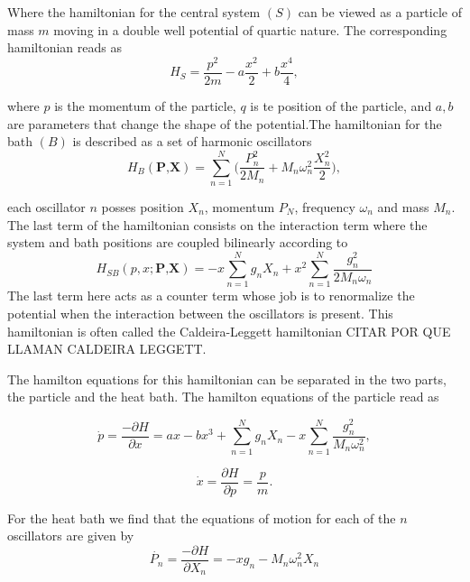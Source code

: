 Where the hamiltonian for the central system $(S)$ can be viewed as a particle of mass $m$ moving in a double well potential of quartic nature. The corresponding hamiltonian reads as
\begin{equation}
H_{S}=\frac{p^2}{2m}-a\frac{x^2}{2}+b\frac{x^4}{4},
\end{equation}

where $p$ is the momentum of the particle, $q$ is te position of the particle, and $a,b$ are parameters that change the shape of the potential.The hamiltonian for the bath $(B)$ is described as a set of harmonic oscillators
\begin{equation}
H_B(\textbf{P,X})= \sum_{n=1}^N \Big(\frac{P_n^2}{2M_n}+M_n \omega_n^2\frac{X_n^2}{2} \Big),
\end{equation}

each oscillator $n$ posses position $X_n$, momentum $P_N$, frequency $\omega_n$ and mass $M_n$. The last term of the hamiltonian consists on the interaction term where the system and bath positions are coupled bilinearly according to
\begin{equation}
H_{SB}(p,x;\textbf{P,X})=-x\sum_{n=1}^N g_n X_n+x^2 \sum_{n=1}^N\frac{g_n^2}{2M_n \omega_n}
\end{equation}
The last term here acts as a counter term whose job is to renormalize the potential when the interaction between the oscillators is present. This hamiltonian is often called the Caldeira-Leggett hamiltonian CITAR POR QUE LLAMAN CALDEIRA LEGGETT.\par 

The hamilton equations for this hamiltonian can be separated in the two parts, the particle and the heat bath. The hamilton equations of the particle read as

\begin{equation}
\dot{p}=\frac{-\partial H}{\partial x}=ax-bx^3+\sum_{n=1}^N g_n X_n-x\sum_{n=1}^N \frac{g_n^2}{M_n \omega_n^2},
\end{equation}

\begin{equation}
\dot{x}=\frac{\partial H}{\partial p}=\frac{p}{m}.
\end{equation}

For the heat bath we find that the equations of motion for each of the $n$ oscillators are given by
\begin{equation}
\dot{P_n}=\frac{-\partial H}{\partial X_n}=-xg_n-M_n \omega _n ^2 X_n
\end{equation}

